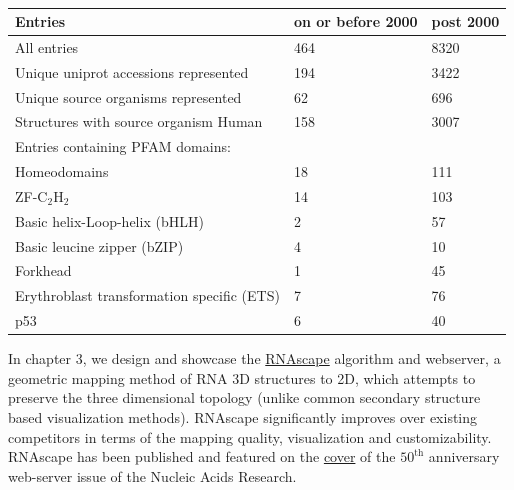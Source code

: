 \begin{table}[]
\centering
\begin{tabular}{|l|l|l|}
\hline
Entries & on or before 2000 & post 2000 \\
\hline
All entries & 464 & 8320  \\
Unique uniprot accessions represented & 194 & 3422  \\
Unique source organisms represented & 62 & 696 \\
Structures with source organism Human & 158 & 3007  \\
\hline
Entries containing PFAM domains: &  &  \\
\hline
Homeodomains & 18 & 111  \\
ZF-C$_2$H$_2$ & 14 & 103  \\
Basic helix-Loop-helix (bHLH) & 2 & 57  \\
Basic leucine zipper (bZIP) & 4 & 10   \\
Forkhead & 1 & 45   \\
Erythroblast transformation specific (ETS) & 7 & 76   \\
p53 & 6 & 40  \\
\hline
\end{tabular}
\caption[Quanitification of growth of protein-DNA structures on the PDB (based on pre-2000 and post-2000 release dates).]{}
\label{table:intro}
\end{table}

In chapter 3, we design and showcase the  \href{https://rnascape.usc.edu/}{RNAscape} algorithm and webserver, a geometric mapping method of RNA 3D structures to 2D, which attempts to preserve the three dimensional topology (unlike common secondary structure based visualization methods). RNAscape significantly improves over existing competitors \citep{Yang2003} in terms of the mapping quality, visualization and customizability. RNAscape has been published \citep{Mitra2024rnascape} and featured on the \href{https://academic.oup.com/nar/issue/52/W1}{cover} of the $50^\text{th}$ anniversary web-server issue of the Nucleic Acids Research.

